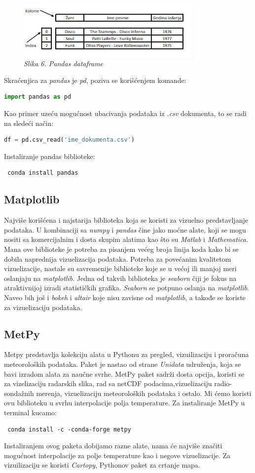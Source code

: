 \documentclass[12pt]{article}
\begin{document}
\begin{figure}[h!]
\centering
\includegraphics[width=0.8\textwidth]{pandas-dataframe.jpg}
\caption*{\textsl{Slika 6. Pandas dataframe }}
\end{figure}
Skraćenjica za \textsl{pandas} je \textsl{pd}, poziva se korišćenjem komande:
\begin{lstlisting}[language=Python]
 import pandas as pd 
\end{lstlisting}
Kao primer uzeću mogućnost ubacivanja podataka iz \textsl{.csv} dokumenta, to se radi na sledeći način:
\begin{lstlisting}[language=Python]
 df = pd.csv_read('ime_dokumenta.csv')
\end{lstlisting}
Instaliranje pandas biblioteke:
\begin{lstlisting}
 conda install pandas
\end{lstlisting}
\subsection{Matplotlib}
Najviše korišćena i najstarija biblioteka koja se koristi za vizuelno predstavljanje podataka. U kombinaciji sa \textsl{numpy} i \textsl{pandas} čine jako moćne alate, koji se mogu nositi sa komercijalnim i dosta skupim alatima kao što su \textsl{Matlab} i \textsl{Mathematica}. Mana ove biblioteke je potreba za pisanjem većeg broja linija koda kako bi se dobila naprednija vizuelizacija podataka. 
Potreba za povećanim kvalitetom vizuelizacije, nastale su savremenije biblioteke koje se u većoj ili manjoj meri oslanjaju na \textsl{matplotlib}. Jedna od takvih biblioteka je \textsl{seaborn} čiji je fokus na  atraktivnijoj izradi statističkih grafika.  \textsl{Seaborn} se potpuno oslanja na \textsl{matplotlib}.  Naveo bih još i \textsl{bokeh} i \textsl{altair} koje nisu zavisne od \textsl{matplotlib}, a takođe se koriste za vizuelizaciju podataka.
\subsection{MetPy}
Metpy predstavlja kolekciju alata u Pythonu za pregled, vizuilizaciju i proračuna meteoroloških podataka. Paket je nastao od strane \textsl{Unidata} udruženja, koja se bavi izradom alata za naučne svrhe. MetPy paket sadrži dosta opcija, koristi se za vizelizaciju radarskih slika, rad sa netCDF podacima,vizuelizaciju radio-sondažnih merenja, vizuelizaciju meteoroloških podataka i ostalo. Mi ćemo koristi ovu biblioteku u svrhu interpolacije polja temperature. Za instaliranje MetPy u terminal kucamo:
\begin{lstlisting}
 conda install -c -conda-forge metpy
\end{lstlisting}
Instaliranjem ovog paketa dobijamo razne alate, nama će najviše značiti mogućnost interpolacije za polje temperature kao i negove vizuelizacije. Za vizuilizaciju se koristi \textsl{Cartopy}, Pythonov paket za crtanje mapa.
\end{document}
